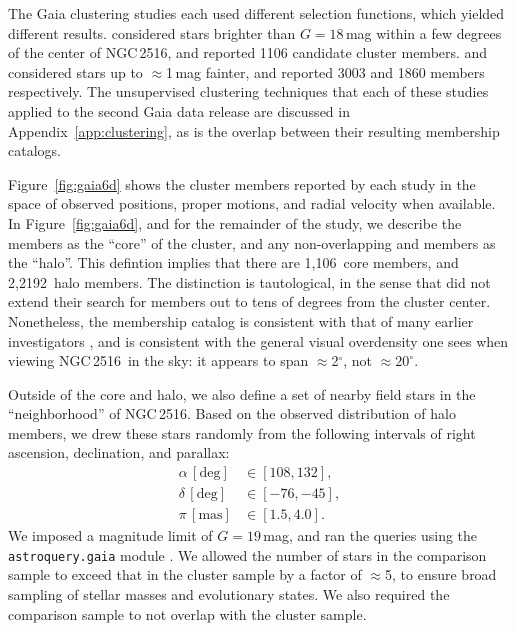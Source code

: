 \documentclass[12pt,twocolumn,tighten]{aastex63}
\newcommand{\cn}{NGC\,2516} %
\newcommand{\ncore}{1{,}106}  %
\newcommand{\nhalo}{2{,}2192} %
\begin{document}
The Gaia clustering studies each used different selection functions,
which yielded different results.  
considered stars brighter than $G=18$\,mag within a few degrees of the
center of \cn, and reported 1106 candidate cluster members.
 and 
considered stars up to $\approx$1\,mag fainter, and reported 3003 and
1860 members respectively.  The unsupervised clustering techniques
that each of these studies applied to the second Gaia data release are
discussed in Appendix~\ref{app:clustering}, as is the overlap between
their resulting membership catalogs.

Figure~\ref{fig:gaia6d} shows the cluster members reported by each
study in the space of observed positions, proper motions, and radial
velocity when available.
In Figure~\ref{fig:gaia6d}, and for the remainder of the study, we
describe the  members as the
``core'' of the cluster, and any non-overlapping
 and 
members as the ``halo''.  This defintion implies that there are
\ncore\ core members, and \nhalo\ halo members.  The distinction is
tautological, in the sense that  did
not extend their search for members out to tens of degrees from the
cluster center.  Nonetheless, the 
membership catalog is consistent with that of many earlier
investigators \citep[{\it
e.g.},][]{jeffries_ngc2516_2001,Kharchenko_et_al_2013}, and is
consistent with the general visual overdensity one sees when viewing
\cn\ in the sky: it appears to span $\approx$2$^\circ$, not
$\approx20^\circ$.

Outside of the core and halo, we also define a set of nearby field
stars in the ``neighborhood'' of \cn.  Based on the observed
distribution of halo members, we drew these stars randomly from the
following intervals of right ascension, declination, and parallax:
\begin{align}
  \alpha\,[\mathrm{deg}] &\in [108, 132], \\
  \delta\,[\mathrm{deg}] &\in [-76, -45], \\
  \pi\,[\mathrm{mas}] &\in [1.5, 4.0].
\end{align}
We imposed a magnitude limit of $G=19$\,mag, and ran the queries using
the \texttt{astroquery.gaia} module \citep{astroquery_2018}.  We
allowed the number of stars in the comparison sample to exceed that in
the cluster sample by a factor of $\approx$5, to ensure broad sampling
of stellar masses and evolutionary states.  We also required the
comparison sample to not overlap with the cluster sample.
\end{document}
